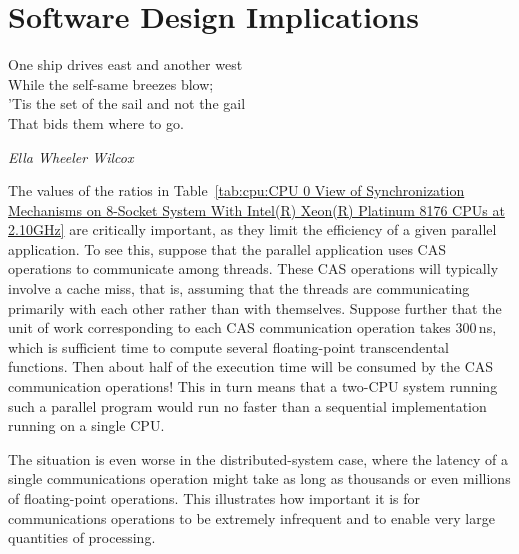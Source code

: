 
\section{Software Design Implications}
\label{sec:cpu:Software Design Implications}
%
\epigraph{One ship drives east and another west \\
	  While the self-same breezes blow; \\
	  'Tis the set of the sail and not the gail \\
	  That bids them where to go.}
	 {\emph{Ella Wheeler Wilcox}}

The values of the ratios in
Table~\ref{tab:cpu:CPU 0 View of Synchronization Mechanisms on 8-Socket System With Intel(R) Xeon(R) Platinum 8176 CPUs at 2.10GHz}
are critically important, as they limit the
efficiency of a given parallel application.
To see this, suppose that the parallel application uses CAS
operations to communicate among threads.
These CAS operations will typically involve a cache miss, that is, assuming
that the threads are communicating primarily with each other rather than
with themselves.
Suppose further that the unit of work corresponding to each CAS communication
operation takes 300\,ns, which is sufficient time to compute several
floating-point transcendental functions.
Then about half of the execution time will be consumed by the CAS
communication operations!
This in turn means that a two-CPU system running such a parallel program
would run no faster than a sequential implementation running on a
single CPU.

The situation is even worse in the distributed-system case, where the
latency of a single communications operation might take as long as
thousands or even millions of floating-point operations.
This illustrates how important it is for communications operations to
be extremely infrequent and to enable very large quantities of processing.

